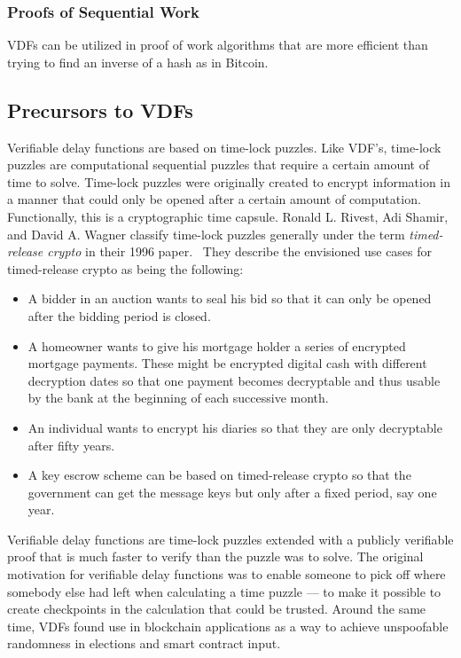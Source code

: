 \subsubsection{Proofs of Sequential Work}
VDFs can be utilized in proof of work algorithms that are more efficient than trying to find an inverse of a hash as in Bitcoin.~\cite{Cohen2018-th}

\subsection{Precursors to VDFs}
Verifiable delay functions are based on time-lock puzzles. Like VDF's, time-lock puzzles are computational sequential puzzles that require a certain amount of time to solve.\cite{Rivest_undated-qr} Time-lock puzzles were originally created to encrypt information in a manner that could only be opened after a certain amount of computation. Functionally, this is a cryptographic time capsule. Ronald L. Rivest, Adi Shamir, and David A. Wagner classify time-lock puzzles generally under the term \emph{timed-release crypto} in their 1996 paper.~\cite{Rivest_undated-qr} They describe the envisioned use cases for timed-release crypto as being the following:

\begin{itemize}
	\item A bidder in an auction wants to seal his bid so that it can only be opened after the bidding period is closed.
	\item A homeowner wants to give his mortgage holder a series of encrypted mortgage payments. These might be encrypted digital cash with different decryption dates so that one payment becomes decryptable and thus usable by the bank at the beginning of each successive month.
	\item An individual wants to encrypt his diaries so that they are only decryptable after fifty years.
	\item A key escrow scheme can be based on timed-release crypto so that the government can get the message keys but only after a fixed period, say one year.
\end{itemize}

Verifiable delay functions are time-lock puzzles extended with a publicly verifiable proof that is much faster to verify than the puzzle was to solve. The original motivation for verifiable delay functions was to enable someone to pick off where somebody else had left when calculating a time puzzle --- to make it possible to create checkpoints in the calculation that could be trusted. Around the same time, VDFs found use in blockchain applications as a way to achieve unspoofable randomness in elections and smart contract input.

